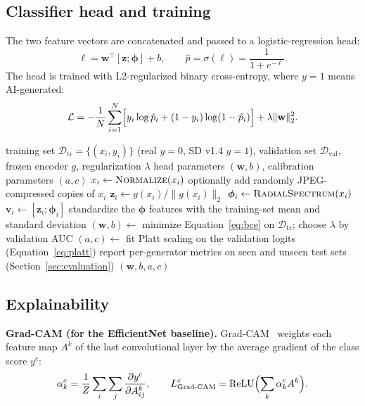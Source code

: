 \documentclass[11pt,a4paper]{article}
\begin{document}
\subsection{Classifier head and training}
The two feature vectors are concatenated and passed to a logistic-regression head:
\begin{equation}
  \ell=\mathbf{w}^{\top}[\mathbf{z};\boldsymbol{\phi}]+b,\qquad
  \hat p=\sigma(\ell)=\frac{1}{1+e^{-\ell}}.
  \label{eq:head}
\end{equation}
The head is trained with L2-regularized binary cross-entropy, where $y=1$ means AI-generated:
\begin{equation}
  \mathcal{L}=-\frac{1}{N}\sum_{i=1}^{N}\Bigl[y_i\log\hat p_i+(1-y_i)\log(1-\hat p_i)\Bigr]
  +\lambda\lVert\mathbf{w}\rVert_2^2 .
  \label{eq:bce}
\end{equation}

\begin{algorithm}[htbp]
\caption{Training the Phase 1 image detector}
\label{alg:image-train}
\begin{algorithmic}[1]
\Require training set $\mathcal{D}_{\text{tr}}=\{(x_i,y_i)\}$ (real $y{=}0$, SD v1.4 $y{=}1$),
         validation set $\mathcal{D}_{\text{val}}$, frozen encoder $g$, regularization $\lambda$
\Ensure head parameters $(\mathbf{w},b)$, calibration parameters $(a,c)$
  \State $x_i\gets\textsc{Normalize}(x_i)$ 
  \State optionally add randomly JPEG-compressed copies of $x_i$ 
  \State $\mathbf{z}_i\gets g(x_i)/\lVert g(x_i)\rVert_2$ 
  \State $\boldsymbol{\phi}_i\gets\textsc{RadialSpectrum}(x_i)$ 
  \State $\mathbf{v}_i\gets[\mathbf{z}_i;\boldsymbol{\phi}_i]$
\EndFor
\State standardize the $\boldsymbol{\phi}$ features with the training-set mean and standard deviation
\State $(\mathbf{w},b)\gets$ minimize Equation~\ref{eq:bce} on $\mathcal{D}_{\text{tr}}$; choose $\lambda$ by validation AUC
\State $(a,c)\gets$ fit Platt scaling on the validation logits (Equation~\ref{eq:platt})
\State report per-generator metrics on seen and unseen test sets (Section~\ref{sec:evaluation})
\State \Return $(\mathbf{w},b,a,c)$
\end{algorithmic}
\end{algorithm}

\subsection{Explainability}
\textbf{Grad-CAM (for the EfficientNet baseline).} Grad-CAM~\cite{gradcam} weights each feature
map $A^k$ of the last convolutional layer by the average gradient of the class score $y^c$:
\begin{equation}
  \alpha_k^{c}=\frac{1}{Z}\sum_{i}\sum_{j}\frac{\partial y^{c}}{\partial A^{k}_{ij}},\qquad
  L^{c}_{\text{Grad-CAM}}=\operatorname{ReLU}\Bigl(\sum_k\alpha_k^{c}A^{k}\Bigr).
  \label{eq:gradcam}
\end{equation}
\end{document}
